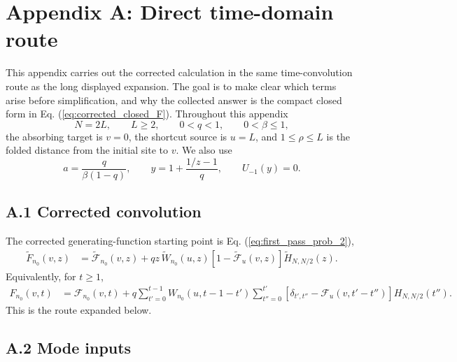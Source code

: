 \documentclass[superscriptaddress, amsmath, amssymb, aps, pre, floatfix]{revtex4-2}
\begin{document}
\clearpage
\appendix
\section*{Appendix A: Direct time-domain route}

This appendix carries out the corrected calculation in the same time-convolution route as the long displayed expansion.  The goal is to make clear which terms arise before simplification, and why the collected answer is the compact closed form in Eq. (\ref{eq:corrected_closed_F}).  Throughout this appendix
\[
  N=2L,\qquad L\geq 2,\qquad 0<q<1,\qquad 0<\beta\leq 1,
\]
the absorbing target is \(v=0\), the shortcut source is \(u=L\), and \(1\leq \rho\leq L\) is the folded distance from the initial site to \(v\).  We also use
\[
  a=\frac{q}{\beta(1-q)},\qquad
  y=1+\frac{1/z-1}{q},\qquad
  U_{-1}(y)=0.
\]

\subsection*{A.1 Corrected convolution}

The corrected generating-function starting point is Eq. (\ref{eq:first_pass_prob_2}),
\begin{align}
\widetilde F_{n_0}(v,z)
&=\widetilde{\mathcal F}_{n_0}(v,z)
+qz\,\widetilde W_{n_0}(u,z)
\left[1-\widetilde{\mathcal F}_{u}(v,z)\right]\widetilde H_{N,N/2}(z).
\label{eq:app_time_route_gf}
\end{align}
Equivalently, for \(t\geq1\),
\begin{align}
F_{n_0}(v,t)
&=\mathcal F_{n_0}(v,t)
+q\sum_{t'=0}^{t-1}W_{n_0}(u,t-1-t')
\sum_{t''=0}^{t'}
\left[\delta_{t',t''}-\mathcal F_u(v,t'-t'')\right]H_{N,N/2}(t'').
\label{eq:app_time_route_conv}
\end{align}
This is the route expanded below.

\subsection*{A.2 Mode inputs}
\end{document}

